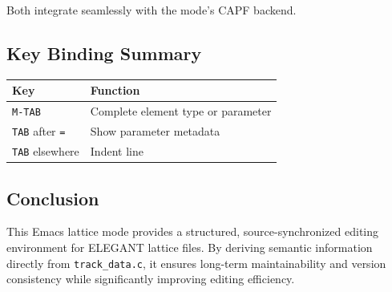 Both integrate seamlessly with the mode’s CAPF backend.

\subsection{Key Binding Summary}

\begin{center}
\begin{tabular}{ll}
\toprule
\textbf{Key} & \textbf{Function} \\
\midrule
\texttt{M-TAB} & Complete element type or parameter \\
\texttt{TAB} after \texttt{=} & Show parameter metadata \\
\texttt{TAB} elsewhere & Indent line \\
\bottomrule
\end{tabular}
\end{center}

\subsection{Conclusion}

This Emacs lattice mode provides a structured, source-synchronized editing environment for ELEGANT lattice files. By
deriving semantic information directly from \texttt{track\_data.c}, it ensures long-term maintainability and version
consistency while significantly improving editing efficiency.

